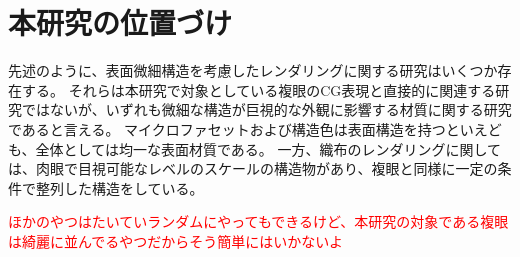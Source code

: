\section{本研究の位置づけ}
\label{SPosition}

先述のように、表面微細構造を考慮したレンダリングに関する研究はいくつか存在する。
それらは本研究で対象としている複眼のCG表現と直接的に関連する研究ではないが、いずれも微細な構造が巨視的な外観に影響する材質に関する研究であると言える。
マイクロファセットおよび構造色は表面構造を持つといえども、全体としては均一な表面材質である。
一方、織布のレンダリングに関しては、肉眼で目視可能なレベルのスケールの構造物があり、複眼と同様に一定の条件で整列した構造をしている。


\textcolor{red}{ほかのやつはたいていランダムにやってもできるけど、本研究の対象である複眼は綺麗に並んでるやつだからそう簡単にはいかないよ}
